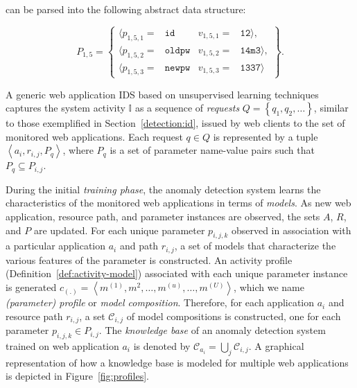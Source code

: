 \noindent can be parsed into the following abstract data structure:

\begin{displaymath}
  P_{1,5}=\left\{
    \begin{array}{rlrl}
        \langle p_{1,5,1} =& \mathtt{id} & v_{1,5,1} =& \mathtt{12}\rangle,\\
        \langle p_{1,5,2} =& \mathtt{oldpw} & v_{1,5,2} =& \mathtt{14m3}\rangle,\\
        \langle p_{1,5,3} =& \mathtt{newpw} & v_{1,5,3} =& \mathtt{1337}\rangle
    \end{array}
  \right\}.
\end{displaymath}

A generic web application \ac{IDS} based on unsupervised learning
techniques captures the system activity $\mathbb{I}$ as a sequence of
\emph{requests} $Q = \left\{q_1, q_2, \ldots \right\}$, similar to
those exemplified in Section~\ref{detection:id}, issued by web clients
to the set of monitored web applications. Each request $q \in Q$ is
represented by a tuple $\left\langle a_i,r_{i,j},P_q \right\rangle$,
where $P_q$ is a set of parameter name-value pairs such that $P_q
\subseteq P_{i,j}$.

During the initial \emph{training phase}, the anomaly detection system
learns the characteristics of the monitored web applications in terms
of \emph{models}.  As new web application, resource path, and
parameter instances are observed, the sets $A$, $R$, and $P$ are
updated. For each unique parameter $p_{i,j,k}$ observed in association
with a particular application $a_i$ and path $r_{i,j}$, a set of
models that characterize the various features of the parameter is
constructed.  An activity profile
(Definition~\ref{def:activity-model}) associated with each unique
parameter instance is generated $c_{\left(.\right)} = \left\langle
  m^{(1)},m^{2},\ldots,m^{(u)},\ldots,m^{(U)} \right\rangle$, which we
name \emph{(parameter) profile} or \emph{model composition}.
Therefore, for each application $a_i$ and resource path $r_{i,j}$, a
set $\mathcal{C}_{i,j}$ of model compositions is constructed, one for
each parameter $p_{i,j,k}\in P_{i,j}$.  The \emph{knowledge base} of
an anomaly detection system trained on web application $a_i$ is
denoted by $\mathcal{C}_{a_i}=\bigcup_{j}\mathcal{C}_{i,j}$.  A
graphical representation of how a knowledge base is modeled for
multiple web applications is depicted in Figure~\ref{fig:profiles}.


